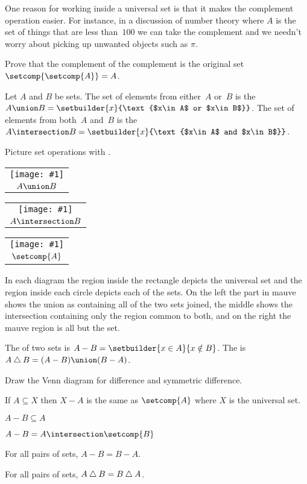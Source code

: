 \documentclass{ibl}
\makeatletter
\newcommand{\venn}[2]{\begin{tabular}{@{}c@{}}\texttt{[image: \#1]} \\ #2\end{tabular}}
\makeatother
\begin{document}
One reason for working inside a universal set is that it makes the complement
operation easier. 
For instance, in a discussion of number theory where $A$ is the set of 
things that are less than~$100$ we can take the complement and we needn't 
worry about picking up unwanted objects such as $\pi$.

\begin{ex}
Prove that the complement of the complement is the original set
  $\setcomp{\setcomp{A}}=A$. 
\end{ex}

\begin{df}
Let $A$ and $B$ be sets.
The set of elements 
from either~$A$ or~$B$ is the 
$A\union B=\setbuilder{x}{\text{$x\in A$ or $x\in B$}}$.  
The set of elements 
from both~$A$ and~$B$ is the  
$A\intersection B=\setbuilder{x}{\text{$x\in A$ and $x\in B$}}$.  
\end{df}

Picture set operations with .
\begin{center}
  \venn{asy/venn_union.pdf}{$A\union B$}
  \hspace*{3em}
  \venn{asy/venn_int.pdf}{$A\intersection B$}
  \hspace*{3em}
  \venn{asy/venn_comp.pdf}{$\setcomp{A}$}
\end{center}
In each diagram
the region inside the rectangle depicts the universal set and the 
region inside each circle depicts each of the sets.
On the left the part in mauve shows 
the union as containing all of the two sets joined, 
the middle shows the intersection
containing only the region common to both,
and on the right the mauve region is all but the set.

\begin{df}
The  of two sets is $A-B=\setbuilder{x\in A}{x\notin B}$.  
The  is 
$A\symdiff B=(A-B)\union(B-A)$.
\end{df}

\begin{ex}
Draw the Venn diagram for difference and symmetric difference.  
\end{ex}

\begin{ex} \pord
\begin{exes}
\item If $A\subseteq X$ then $X-A$ is the same as $\setcomp{A}$ where
$X$ is the universal set.     
\item $A-B\subseteq A$
\item $A-B=A\intersection\setcomp{B}$
\item For all pairs of sets, $A-B=B-A$.
\item For all pairs of sets, $A\mathbin{\triangle} B=B\mathbin{\triangle} A$.
\end{exes}
\end{ex}
\end{document}
